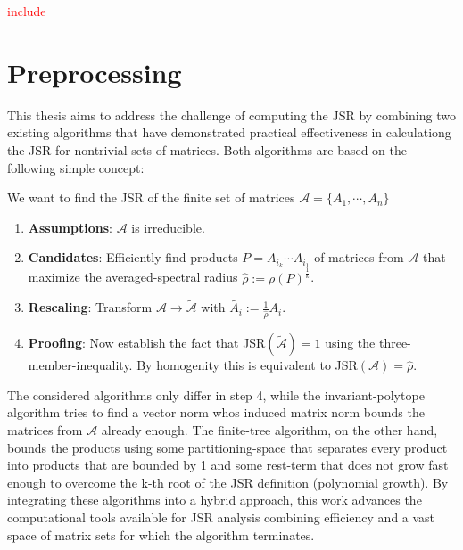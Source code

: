 \begin{example}
    \textcolor{red}{include}
\end{example}

\section{Preprocessing}
\label{sec:preprocessing}
This thesis aims to address the challenge of computing the JSR by combining two existing algorithms that have demonstrated practical effectiveness in calculationg the JSR for nontrivial sets of matrices. Both algorithms are based on the following simple concept:

We want to find the JSR of the finite set of matrices $\mathcal{A} = \{A_1, \cdots, A_n\}$
\begin{enumerate}
    \item \textbf{Assumptions}: $\mathcal{A}$ is irreducible. 
    \item \textbf{Candidates}: Efficiently find products $P = A_{i_k} \cdots A_{i_1}$ of matrices from $\mathcal{A}$ that maximize the averaged-spectral radius $\hat{\rho} := \rho(P)^\frac{1}{k}$.
    \item \textbf{Rescaling}: Transform $\mathcal{A} \to \tilde{\mathcal{A}}$ with $\tilde{A_i} := \frac{1}{\hat{\rho}} A_i$.
    \item \textbf{Proofing}: Now establish the fact that JSR$(\tilde{\mathcal{A}}) = 1$ using the three-member-inequality. By homogenity this is equivalent to JSR$(\mathcal{A}) = \hat{\rho}$.
\end{enumerate}

The considered algorithms only differ in step 4, while the invariant-polytope algorithm tries to find a vector norm whos induced matrix norm bounds the matrices from $\mathcal{A}$ already enough. The finite-tree algorithm, on the other hand, bounds the products using some partitioning-space that separates every product into products that are bounded by 1 and some rest-term that does not grow fast enough to overcome the k-th root of the JSR definition (polynomial growth).
By integrating these algorithms into a hybrid approach, this work advances the computational tools available for JSR analysis combining efficiency and a vast space of matrix sets for which the algorithm terminates.
